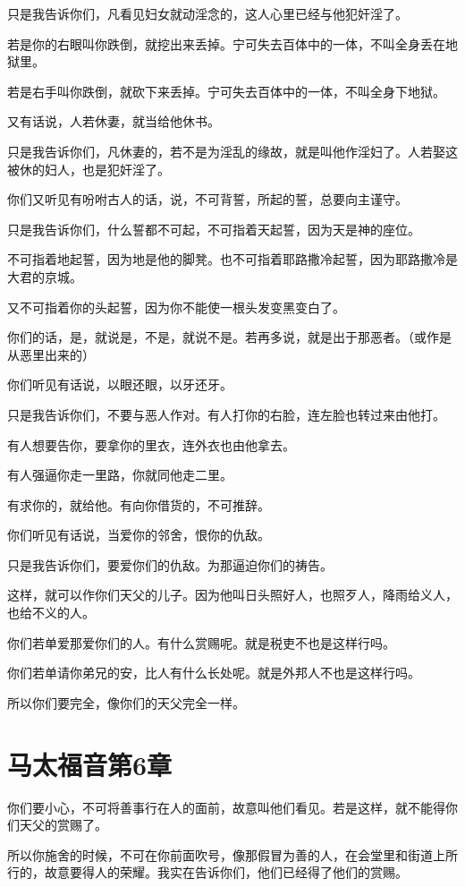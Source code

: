 \documentclass[12pt,oneside]{book}
\begin{document}
只是我告诉你们，凡看见妇女就动淫念的，这人心里已经与他犯奸淫了。

若是你的右眼叫你跌倒，就挖出来丢掉。宁可失去百体中的一体，不叫全身丢在地狱里。

若是右手叫你跌倒，就砍下来丢掉。宁可失去百体中的一体，不叫全身下地狱。

又有话说，人若休妻，就当给他休书。

只是我告诉你们，凡休妻的，若不是为淫乱的缘故，就是叫他作淫妇了。人若娶这被休的妇人，也是犯奸淫了。

你们又听见有吩咐古人的话，说，不可背誓，所起的誓，总要向主谨守。

只是我告诉你们，什么誓都不可起，不可指着天起誓，因为天是神的座位。

不可指着地起誓，因为地是他的脚凳。也不可指着耶路撒冷起誓，因为耶路撒冷是大君的京城。

又不可指着你的头起誓，因为你不能使一根头发变黑变白了。

你们的话，是，就说是，不是，就说不是。若再多说，就是出于那恶者。（或作是从恶里出来的）

你们听见有话说，以眼还眼，以牙还牙。

只是我告诉你们，不要与恶人作对。有人打你的右脸，连左脸也转过来由他打。

有人想要告你，要拿你的里衣，连外衣也由他拿去。

有人强逼你走一里路，你就同他走二里。

有求你的，就给他。有向你借货的，不可推辞。

你们听见有话说，当爱你的邻舍，恨你的仇敌。

只是我告诉你们，要爱你们的仇敌。为那逼迫你们的祷告。

这样，就可以作你们天父的儿子。因为他叫日头照好人，也照歹人，降雨给义人，也给不义的人。

你们若单爱那爱你们的人。有什么赏赐呢。就是税吏不也是这样行吗。

你们若单请你弟兄的安，比人有什么长处呢。就是外邦人不也是这样行吗。

所以你们要完全，像你们的天父完全一样。

\chapter{马太福音第6章}
你们要小心，不可将善事行在人的面前，故意叫他们看见。若是这样，就不能得你们天父的赏赐了。

所以你施舍的时候，不可在你前面吹号，像那假冒为善的人，在会堂里和街道上所行的，故意要得人的荣耀。我实在告诉你们，他们已经得了他们的赏赐。
\end{document}
